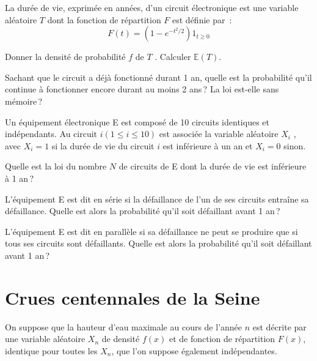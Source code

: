 La durée de vie, exprimée en années, d'un circuit électronique est une
variable aléatoire \(T\) dont la fonction de répartition \(F\) est
définie par~: \[F (t) = (1 - e^{-t^2 /2} )1_{t\geq 0}\]

\label{II-dureevie1}
Donner la densité de probabilité \(f\) de \(T\) . Calculer
\(\mathbb{E}(T)\).

\label{II-dureevie2}
Sachant que le circuit a déjà fonctionné durant 1 an, quelle est la
probabilité qu'il continue à fonctionner encore durant au moins 2 ans\,?
La loi est-elle sans mémoire\,?

Un équipement électronique E est composé de 10 circuits identiques et
indépendants. Au circuit \(i (1 \leq i \leq 10)\) est associée la
variable aléatoire \(X_i\) , avec \(X_i = 1\) si la durée de vie du
circuit \(i\) est inférieure à un an et \(X_i = 0\)
sinon.

\label{II-dureevie3}
Quelle est la loi du nombre \(N\) de circuits de E dont la durée de vie
est inférieure à 1 an\,?

\label{II-dureevie4}
L'équipement E est dit en série si la défaillance de l'un de ses
circuits entraîne sa défaillance. Quelle est alors la probabilité qu'il
soit défaillant avant 1 an\,?

\label{II-dureevie5}
L'équipement E est dit en parallèle si sa défaillance ne peut se
produire que si tous ses circuits sont défaillants. Quelle est alors la
probabilité qu'il soit défaillant avant 1
an\,?

\section{Crues centennales de la
Seine}\label{II-crues-centennales-de-la-seine}

On suppose que la hauteur d'eau maximale au cours de l'année \(n\) est
décrite par une variable aléatoire \(X_n\) de densité \(f(x)\) et de
fonction de répartition \(F(x)\), identique pour toutes les \(X_n\), que
l'on suppose également indépendantes.

